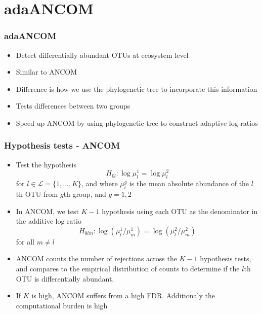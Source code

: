 \documentclass{beamer}
\begin{document}
\section{adaANCOM}

\begin{frame}
\frametitle{adaANCOM}
\begin{itemize}
  \item Detect differentially abundant OTUs at ecosystem level
  \item Similar to ANCOM
  \item Difference is how we use the phylogenetic tree to incorporate this information
  \item Tests differences between two groups
  \item Speed up ANCOM by using phylogenetic tree to construct adaptive log-ratios
\end{itemize}
\end{frame}
\begin{frame}
\frametitle{Hypothesis tests - ANCOM}
\begin{itemize}
  \item Test the hypothesis
  $$H_{0l}: \log \mu_l^1 = \log \mu_l^2$$
  for $l \in \mathcal{L} = \{1, \ldots , K\}$, and where $\mu_l^g$ is the mean absolute abundance of the $l$th OTU from $g$th group, and $g = 1,2$
  \item In ANCOM, we test $K-1$ hypothesis using each OTU as the denominator in the additive log ratio
  $$H_{0lm}: \log(\mu_l^1/\mu_m^1) = \log(\mu_l^2/\mu_m^2)$$ for all $m \neq l$
  \item ANCOM counts the number of rejections across the $K-1$ hypothesis tests, and compares to the empirical distribution of counts to determine if the $l$th OTU is differentially abundant.
  \item If $K$ is high, ANCOM suffers from a high FDR. Additionaly the computational burden is high
\end{itemize}
\end{frame}
\end{document}
